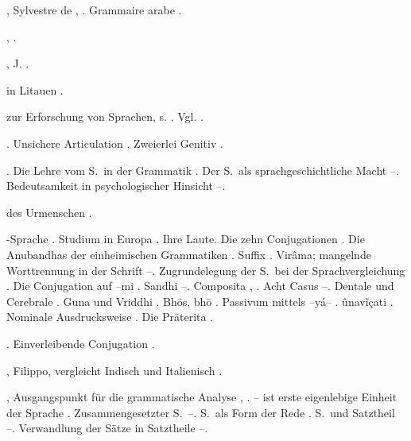 \begin{register}
, Sylvestre de \pageref{sp.15}, \pageref{sp.31}. Grammaire arabe \pageref{sp.111}.

 \pageref{sp.160}, \pageref{sp.307}.

, J. \pageref{sp.26}.

 in Litauen \pageref{sp.287}.

 zur Erforschung von Sprachen, s. . Vgl. .

. Unsichere Articulation \pageref{sp.193}. Zweierlei Genitiv \pageref{sp.463}.

. Die Lehre vom S.~in der Grammatik \pageref{sp.87}.  Der S.~als sprachgeschichtliche Macht \pageref{sp.196}–\pageref{sp.205}. Bedeutsamkeit in psychologischer Hinsicht \pageref{sp.401}–\pageref{sp.403}.

 des Urmenschen \pageref{sp.309}.

-Sprache \pageref{sp.22}. Studium in Europa \pageref{sp.26}. Ihre Laute\pageref{sp.34}. Die zehn Conjugationen \pageref{sp.116}. Die Anubandhas der einheimischen Grammatiken \pageref{sp.119}. Suffix  \pageref{sp.123}. Virâma; mangelnde Worttrennung in der Schrift \pageref{sp.131}–\pageref{sp.132}. Zugrundelegung der S.~bei der  Sprachvergleichung \sed{\pageref{sp.141},} \pageref{sp.186}. Die Conjugation auf –mi \pageref{sp.186}. Sandhi \pageref{sp.199}–\pageref{sp.200}. Composita \pageref{sp.236}, \pageref{sp.466}.  Acht Casus \pageref{sp.253}–\pageref{sp.254}. Dentale und Cerebrale \pageref{sp.269}. Guna und Vriddhi \pageref{sp.352}. Bh\=os, bh\=o \pageref{sp.360}.  Passivum mittels –yá– \pageref{sp.397}. ûnavĩçati \pageref{sp.402}. Nominale Ausdrucksweise \pageref{sp.425}. Die Präterita \pageref{sp.446}.

 \pageref{sp.249}\sed{, \pageref{sp.390}}. Einverleibende Conjugation \pageref{sp.358}.

, Filippo, vergleicht Indisch und Italienisch \pageref{sp.25}.

, Ausgangspunkt für die grammatische Analyse \pageref{sp.86}, \pageref{sp.89}. – ist erste eigenlebige Einheit der Sprache \pageref{sp.88}. Zusammengesetzter S.~\pageref{sp.103}–\pageref{sp.104}. S.~als Form der Rede \pageref{sp.322}. S.~und Satztheil \pageref{sp.451}–\pageref{sp.456}. Verwandlung der Sätze in Satztheile \pageref{sp.463}–\pageref{sp.470}.


\end{register}
